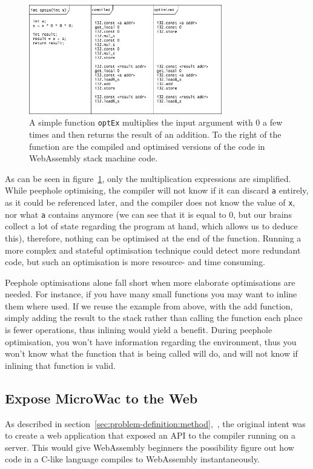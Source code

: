 \documentclass[a4paper]{article}
\begin{document}
\begin{figure}[H]
	\includegraphics[width=0.75\textwidth]{PeepholeOptimisation}
	\centering
	\caption{A simple function \texttt{optEx} multiplies the input argument with $0$ a few times and then returns the result of an addition. To the right of the function are the compiled and optimised versions of the code in WebAssembly stack machine code.}
\label{fig:peephole-optimisation}
\end{figure}
As can be seen in figure~\ref{fig:peephole-optimisation}, only the multiplication expressions are simplified. While peephole optimising, the compiler will not know if it can discard \texttt{a} entirely, as it could be referenced later, and the compiler does not know the value of \texttt{x}, nor what \texttt{a} contains anymore (we can see that it is equal to $0$, but our brains collect a lot of state regarding the program at hand, which allows us to deduce this), therefore, nothing can be optimised at the end of the function. Running a more complex and stateful optimisation technique could detect more redundant code, but such an optimisation is more resource- and time consuming.

Peephole optimisations alone fall short when more elaborate optimisations are needed. For instance, if you have many small functions you may want to inline them where used. If we reuse the example from above, with the add function, simply adding the result to the stack rather than calling the function each place is fewer operations, thus inlining would yield a benefit. During peephole optimisation, you won't have information regarding the environment, thus you won’t know what the function that is being called will do, and will not know if inlining that function is valid.

\subsection{Expose MicroWac to the Web}
As described in section~\ref{sec:problem-definition:method},~, the original intent was to create a web application that exposed an API to the compiler running on a server. This would give WebAssembly beginners the possibility figure out how code in a C-like language compiles to WebAssembly instantaneously.
\end{document}
